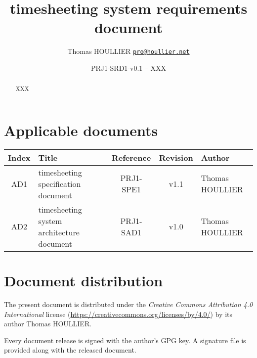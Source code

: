 \documentclass[letterpaper]{article}
\title{timesheeting system requirements document}
\author{Thomas HOULLIER \href{mailto:pro@houllier.net}
         {\texttt{\textlangle pro@houllier.net\textrangle}}}
\begin{document}
\frenchspacing
\date{PRJ1-SRD1-v0.1 -- XXX}
\maketitle
\thispagestyle{FirstPage}

\begin{abstract}
  XXX
\end{abstract}

\begin{versionhistory}
\end{versionhistory}
\setcounter{table}{0} %

\section*{Applicable documents}
{ \centering
\begin{tabularx}{\textwidth}{| c | X | c | c | X |} \hline
  Index & Title & Reference & Revision & Author \\ \hline
  AD1   & timesheeting specification document & PRJ1-SPE1 & v1.1 & Thomas
  HOULLIER \\ \hline
  AD2   & timesheeting system architecture document & PRJ1-SAD1 & v1.0 & Thomas
  HOULLIER \\
  \hline \end{tabularx} \par }

\section*{Document distribution}
The present document is distributed under the \emph{Creative Commons Attribution
4.0 International} license (\url{https://creativecommons.org/licenses/by/4.0/})
by its author Thomas HOULLIER.

Every document release is signed with the author's GPG key. A signature file
is provided along with the released document.

\tableofcontents
\printglossary[type=\acronymtype,style=index]
\pagestyle{plain}


\appendix


\apptocmd{\thebibliography}{\raggedright}{}{}
\begingroup
{}
\setlength\bibitemsep{0pt}
\printbibliography
\endgroup
\end{document}
